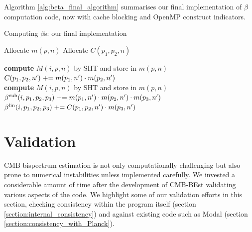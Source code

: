 Algorithm \ref{alg:beta_final_algorithm} summarises our final implementation of $\beta$ computation code, now with cache blocking and OpenMP construct indicators.

\begin{algorithm}[htbp]
	\caption{Computing $\beta$s: our final implementation}
	\label{alg:beta_final_algorithm}
	\begin{algorithmic}[1] %
		\State Allocate $m(p,n)$ 
		\State Allocate $C(p_1,p_2,n)$ 
		\\

		\State \textbf{compute} $M(i,p,n)$ by SHT and store in $m(p,n)$
		\EndFor
		\\
		\State $C(p_1,p_2,n') \mathrel{+}= m(p_1,n') \cdot m(p_2,n')$
		\EndFor
		\EndFor
		\EndFor
		\EndFor
		\\
		\State \textbf{compute} $M(i,p,n)$ by SHT and store in $m(p,n)$
		\EndFor
		\\
		\State $\beta^\text{cub}(i, p_1, p_2, p_3) \mathrel{+}= m(p_1,n') \cdot m(p_2,n') \cdot m(p_3,n')$
		\State $\beta^\text{lin}(i, p_1, p_2, p_3) \mathrel{+}= C(p_1, p_2, n') \cdot m( p_3, n')$
		\EndFor
		\EndFor
		\EndFor
		\EndFor
	\end{algorithmic}
\end{algorithm}

\section{Validation} \label{section:validation}

CMB bispectrum estimation is not only computationally challenging but also prone to numerical instabilities unless implemented carefully. We invested a considerable amount of time after the development of CMB-BEst validating various aspects of the code. We highlight some of our validation efforts in this section, checking consistency within the program itself (section \ref{section:internal_consistency}) and against existing code such as Modal \cite{Fergusson2012} (section \ref{section:consistency_with_Planck}).

